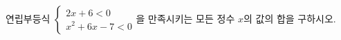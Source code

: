 \hspace*{2mm}\begin{minipage}[t]{\dimexpr\linewidth-2mm\relax}\vspace{0pt}
연립부등식 $\begin{cases} 2x+6<0 \\ x^2+6x-7<0 \end{cases}$을 만족시키는 모든 정수 $x$의 값의 합을 구하시오.\end{minipage}
